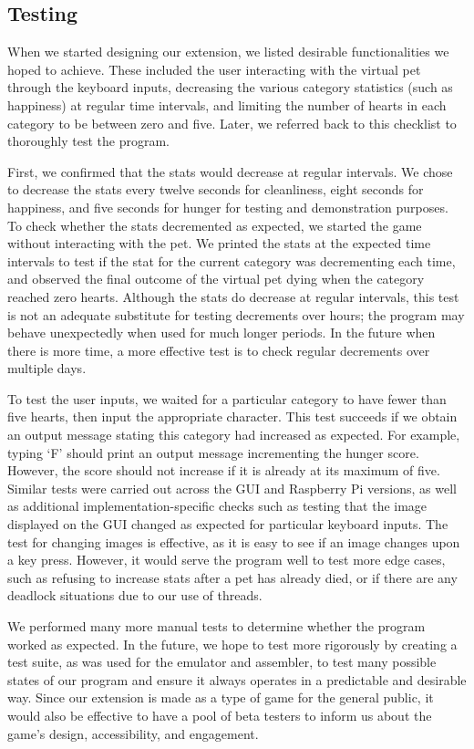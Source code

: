 \documentclass[11pt]{article}
\begin{document}
\subsection{Testing}

When we started designing our extension, we listed desirable functionalities we hoped to 
achieve. These included the user interacting with the virtual pet through the keyboard inputs, 
decreasing the various category statistics (such as happiness) at regular time intervals, 
and limiting the number of hearts in each category to be between zero and five. Later, we referred 
back to this checklist to thoroughly test the program. 

First, we confirmed that the stats would decrease at regular intervals. We chose to decrease the stats
every twelve seconds for cleanliness, eight seconds for happiness, and five seconds for hunger for 
testing and demonstration purposes. To check whether the stats decremented as expected, we started 
the game without interacting with the pet. We printed the stats at the expected 
time intervals to test if the stat for the current category was decrementing each time, and 
observed the final outcome of the virtual pet dying when the category reached zero hearts. Although 
the stats do decrease at regular intervals, this test is not an adequate substitute for testing 
decrements over hours; the program may behave unexpectedly when used for much longer periods. 
In the future when there is more time, a more effective test is to check regular decrements over multiple days. 

To test the user inputs, we waited for a particular category to have fewer than five hearts, 
then input the appropriate character. This test succeeds if we obtain an output message stating 
this category had increased as expected. For example, typing ‘F’ should print an output 
message incrementing the hunger score. However, the score should not increase if it is already 
at its maximum of five. Similar tests were carried out across the GUI and 
Raspberry Pi versions, as well as additional implementation-specific checks such as testing 
that the image displayed on the GUI changed as expected for particular keyboard inputs. The test 
for changing images is effective, as it is easy to see if an image changes upon a key press. 
However, it would serve the program well to test more edge cases, such as refusing to increase 
stats after a pet has already died, or if there are any deadlock situations due to our use of threads. 

We performed many more manual tests to determine whether the program worked as expected. 
In the future, we hope to test more rigorously by creating a test suite, as was used for the 
emulator and assembler, to test many possible states of our program and ensure it always 
operates in a predictable and desirable way. Since our extension is made as a type of game for 
the general public, it would also be effective to have a pool of beta testers to inform us about 
the game's design, accessibility, and engagement. 
\end{document}
